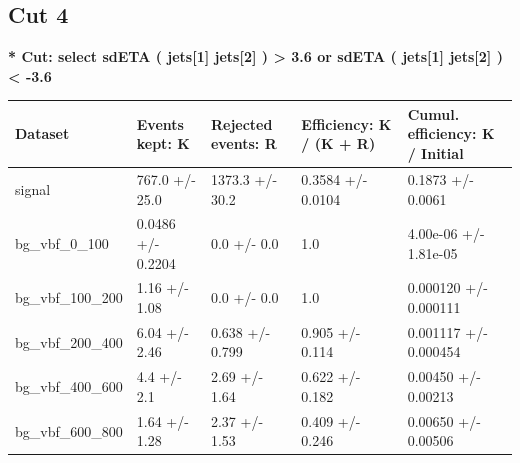 \documentclass[a4paper, 10pt]{article}
\begin{document}
   \newpage
\subsection{Cut 4}

\textbf{* Cut: select sdETA ( jets[1] jets[2] ) > 3.6 or sdETA ( jets[1] jets[2] ) < -3.6}\\
   \begin{table}[H]
  \begin{center}
    \begin{tabular}{|m{20.0mm}|m{27.0mm}|m{27.0mm}|m{33.0mm}|m{32.0mm}|}
      \hline
      {\cellcolor{yellow}         Dataset}& {\cellcolor{yellow}         Events kept:
          K}& {\cellcolor{yellow}         Rejected events:
          R}& {\cellcolor{yellow}         Efficiency:
          K /\- (K + R)}& {\cellcolor{yellow}         Cumul. efficiency:
          K /\- Initial}\\
      \hline
      {\cellcolor{white}         signal}& {\cellcolor{white}         767.0 +/\-- 25.0}& {\cellcolor{white}         1373.3 +/\-- 30.2}& {\cellcolor{white}         0.3584 +/\-- 0.0104}& {\cellcolor{white}         0.1873 +/\-- 0.0061}\\
      \hline
      {\cellcolor{white}         bg\_vbf\_0\_100}& {\cellcolor{white}         0.0486 +/\-- 0.2204}& {\cellcolor{white}         0.0 +/\-- 0.0}& {\cellcolor{white}         1.0}& {\cellcolor{white}         4.00e-06 +/\-- 1.81e-05}\\
      \hline
      {\cellcolor{white}         bg\_vbf\_100\_200}& {\cellcolor{white}         1.16 +/\-- 1.08}& {\cellcolor{white}         0.0 +/\-- 0.0}& {\cellcolor{white}         1.0}& {\cellcolor{white}         0.000120 +/\-- 0.000111}\\
      \hline
      {\cellcolor{white}         bg\_vbf\_200\_400}& {\cellcolor{white}         6.04 +/\-- 2.46}& {\cellcolor{white}         0.638 +/\-- 0.799}& {\cellcolor{white}         0.905 +/\-- 0.114}& {\cellcolor{white}         0.001117 +/\-- 0.000454}\\
      \hline
      {\cellcolor{white}         bg\_vbf\_400\_600}& {\cellcolor{white}         4.4 +/\-- 2.1}& {\cellcolor{white}         2.69 +/\-- 1.64}& {\cellcolor{white}         0.622 +/\-- 0.182}& {\cellcolor{white}         0.00450 +/\-- 0.00213}\\
      \hline
      {\cellcolor{white}         bg\_vbf\_600\_800}& {\cellcolor{white}         1.64 +/\-- 1.28}& {\cellcolor{white}         2.37 +/\-- 1.53}& {\cellcolor{white}         0.409 +/\-- 0.246}& {\cellcolor{white}         0.00650 +/\-- 0.00506}\\

\end{tabular}
\end{center}
\end{table}
\end{document}

